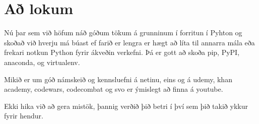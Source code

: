 \section{Að lokum}\label{Að lokum}

Nú þar sem við höfum náð góðum tökum á grunninum í forritun í Pyhton og skoðað við hverju má búast ef farið er lengra er hægt að líta til annarra mála eða frekari notkun Python fyrir ákveðin verkefni.
Þá er gott að skoða pip, PyPI, anaconda, og virtualenv.

Mikið er um góð námskeið og kennsluefni á netinu, eins og á udemy, khan academy, codewars, codecombat og svo er ýmislegt að finna á youtube.

Ekki hika við að gera mistök, þannig verðið þið betri í því sem þið takið ykkur fyrir hendur. 